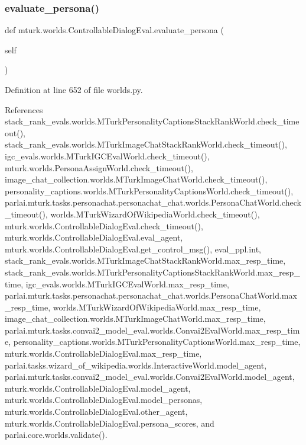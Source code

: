 \subsubsection{\texorpdfstring{evaluate\+\_\+persona()}{evaluate\_persona()}}
{\footnotesize\ttfamily def mturk.\+worlds.\+Controllable\+Dialog\+Eval.\+evaluate\+\_\+persona (\begin{DoxyParamCaption}\item[{}]{self }\end{DoxyParamCaption})}



Definition at line 652 of file worlds.\+py.



References stack\+\_\+rank\+\_\+evals.\+worlds.\+M\+Turk\+Personality\+Captions\+Stack\+Rank\+World.\+check\+\_\+timeout(), stack\+\_\+rank\+\_\+evals.\+worlds.\+M\+Turk\+Image\+Chat\+Stack\+Rank\+World.\+check\+\_\+timeout(), igc\+\_\+evals.\+worlds.\+M\+Turk\+I\+G\+C\+Eval\+World.\+check\+\_\+timeout(), mturk.\+worlds.\+Persona\+Assign\+World.\+check\+\_\+timeout(), image\+\_\+chat\+\_\+collection.\+worlds.\+M\+Turk\+Image\+Chat\+World.\+check\+\_\+timeout(), personality\+\_\+captions.\+worlds.\+M\+Turk\+Personality\+Captions\+World.\+check\+\_\+timeout(), parlai.\+mturk.\+tasks.\+personachat.\+personachat\+\_\+chat.\+worlds.\+Persona\+Chat\+World.\+check\+\_\+timeout(), worlds.\+M\+Turk\+Wizard\+Of\+Wikipedia\+World.\+check\+\_\+timeout(), mturk.\+worlds.\+Controllable\+Dialog\+Eval.\+check\+\_\+timeout(), mturk.\+worlds.\+Controllable\+Dialog\+Eval.\+eval\+\_\+agent, mturk.\+worlds.\+Controllable\+Dialog\+Eval.\+get\+\_\+control\+\_\+msg(), eval\+\_\+ppl.\+int, stack\+\_\+rank\+\_\+evals.\+worlds.\+M\+Turk\+Image\+Chat\+Stack\+Rank\+World.\+max\+\_\+resp\+\_\+time, stack\+\_\+rank\+\_\+evals.\+worlds.\+M\+Turk\+Personality\+Captions\+Stack\+Rank\+World.\+max\+\_\+resp\+\_\+time, igc\+\_\+evals.\+worlds.\+M\+Turk\+I\+G\+C\+Eval\+World.\+max\+\_\+resp\+\_\+time, parlai.\+mturk.\+tasks.\+personachat.\+personachat\+\_\+chat.\+worlds.\+Persona\+Chat\+World.\+max\+\_\+resp\+\_\+time, worlds.\+M\+Turk\+Wizard\+Of\+Wikipedia\+World.\+max\+\_\+resp\+\_\+time, image\+\_\+chat\+\_\+collection.\+worlds.\+M\+Turk\+Image\+Chat\+World.\+max\+\_\+resp\+\_\+time, parlai.\+mturk.\+tasks.\+convai2\+\_\+model\+\_\+eval.\+worlds.\+Convai2\+Eval\+World.\+max\+\_\+resp\+\_\+time, personality\+\_\+captions.\+worlds.\+M\+Turk\+Personality\+Captions\+World.\+max\+\_\+resp\+\_\+time, mturk.\+worlds.\+Controllable\+Dialog\+Eval.\+max\+\_\+resp\+\_\+time, parlai.\+tasks.\+wizard\+\_\+of\+\_\+wikipedia.\+worlds.\+Interactive\+World.\+model\+\_\+agent, parlai.\+mturk.\+tasks.\+convai2\+\_\+model\+\_\+eval.\+worlds.\+Convai2\+Eval\+World.\+model\+\_\+agent, mturk.\+worlds.\+Controllable\+Dialog\+Eval.\+model\+\_\+agent, mturk.\+worlds.\+Controllable\+Dialog\+Eval.\+model\+\_\+personas, mturk.\+worlds.\+Controllable\+Dialog\+Eval.\+other\+\_\+agent, mturk.\+worlds.\+Controllable\+Dialog\+Eval.\+persona\+\_\+scores, and parlai.\+core.\+worlds.\+validate().




